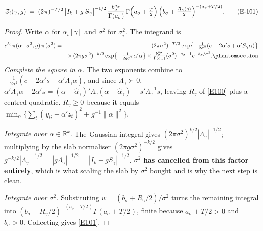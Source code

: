 \begin{proposition}\label{prop:closed}
\begin{equation}
\mathcal{Z}_i(\gamma,g) \;=\; (2\pi)^{-T/2}\,\bigl|I_k + g\,S_\gamma\bigr|^{-1/2}\,
\frac{b_\sigma^{a_\sigma}}{\Gamma(a_\sigma)}\,
\Gamma\Bigl(a_\sigma+\tfrac{T}{2}\Bigr)\,
\Bigl(b_\sigma+\tfrac{R_\gamma(g)}{2}\Bigr)^{-(a_\sigma+T/2)}.
\tag{E-101}\label{E101}
\end{equation}
\end{proposition}

\begin{proof}
Write $\alpha$ for $\alpha_i[\gamma]$ and $\sigma^2$ for $\sigma_i^2$. The integrand
is
\begin{eqnarray}
e^{\ell_i}\,\pi(\alpha\mid\sigma^2,g)\,\pi(\sigma^2) &=& (2\pi\sigma^2)^{-T/2}
  \exp\bigl\{-\tfrac{1}{2\sigma^2}(c-2\alpha's+\alpha'S_\gamma\alpha)\bigr\}
  \nonumber\\
&&\times\,(2\pi g\sigma^2)^{-k/2}\exp\bigl\{-\tfrac{1}{2g\sigma^2}\alpha'\alpha\bigr\}
  \times\tfrac{b_\sigma^{a_\sigma}}{\Gamma(a_\sigma)}(\sigma^2)^{-a_\sigma-1}
  e^{-b_\sigma/\sigma^2}.
  \Elabel{E-98}{E98}
\end{eqnarray}
\emph{Complete the square in $\alpha$.} The two exponents combine to
$-\frac{1}{2\sigma^2}(c-2\alpha's+\alpha'\Lambda_\gamma\alpha)$, and since
$\Lambda_\gamma\succ0$,
$\alpha'\Lambda_\gamma\alpha-2\alpha's=(\alpha-\hat\alpha_\gamma)'\Lambda_\gamma
(\alpha-\hat\alpha_\gamma)-s'\Lambda_\gamma^{-1}s$, leaving $R_\gamma$ of
\eqref{E100} plus a centred quadratic. $R_\gamma\ge0$ because it equals
$\min_\alpha\{\sum_t(y_{ti}-\alpha'z_t)^2+g^{-1}\|\alpha\|^2\}$.

\emph{Integrate over $\alpha\in\mathbb{R}^k$.} The Gaussian integral gives
$(2\pi\sigma^2)^{k/2}|\Lambda_\gamma|^{-1/2}$; multiplying by the slab normaliser
$(2\pi g\sigma^2)^{-k/2}$ gives
$g^{-k/2}|\Lambda_\gamma|^{-1/2}=|g\Lambda_\gamma|^{-1/2}=|I_k+gS_\gamma|^{-1/2}$.
$\sigma^2$ \textbf{has cancelled from this factor entirely}, which is what scaling
the slab by $\sigma^2$ bought and is why the next step is clean.

\emph{Integrate over $\sigma^2$.} Substituting $w=(b_\sigma+R_\gamma/2)/\sigma^2$
turns the remaining integral into
$(b_\sigma+R_\gamma/2)^{-(a_\sigma+T/2)}\Gamma(a_\sigma+T/2)$, finite because
$a_\sigma+T/2>0$ and $b_\sigma>0$. Collecting gives \eqref{E101}.
\end{proof}

